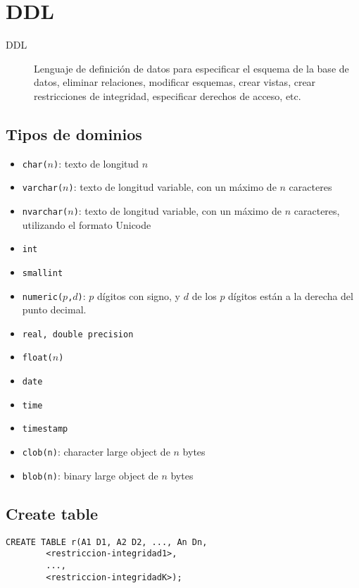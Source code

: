 \documentclass[a4paper, twoside]{article}
\begin{document}
\section{DDL}
\begin{description}
\item [{DDL}] Lenguaje de definición de datos para especificar el esquema
de la base de datos, eliminar relaciones, modificar esquemas, crear
vistas, crear restricciones de integridad, especificar derechos de
acceso, etc.
\end{description}

\subsection{Tipos de dominios}
\begin{itemize}
\item \texttt{char($n$)}: texto de longitud $n$
\item \texttt{varchar($n$)}: texto de longitud variable, con un máximo
de $n$ caracteres
\item \texttt{nvarchar($n$)}: texto de longitud variable, con un máximo
de $n$ caracteres, utilizando el formato Unicode
\item \texttt{int}
\item \texttt{smallint}
\item \texttt{numeric($p$,$d$)}: $p$ dígitos con signo, y $d$ de los
$p$ dígitos están a la derecha del punto decimal.
\item \texttt{real, double precision}
\item \texttt{float($n$)}
\item \texttt{date}
\item \texttt{time}
\item \texttt{timestamp}
\item \texttt{clob(n)}: character large object de $n$ bytes
\item \texttt{blob(n)}: binary large object de $n$ bytes
\end{itemize}

\subsection{Create table}

\begin{lstlisting}
CREATE TABLE r(A1 D1, A2 D2, ..., An Dn,
		<restriccion-integridad1>,
		...,
		<restriccion-integridadK>);
\end{lstlisting}
\end{document}
